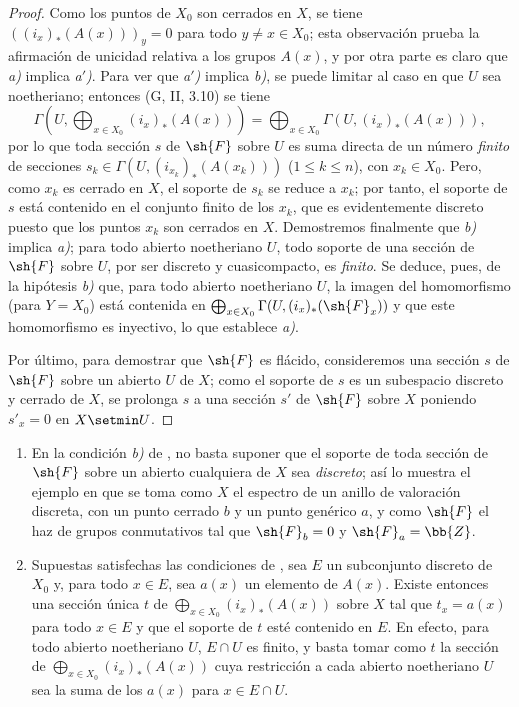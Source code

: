 \begin{proof}

Como los puntos de $X_0$ son cerrados en $X$, se tiene $((i_x)_*(A(x)))_y=0$ 
para todo $y\neq x\in X_0$;
esta observación prueba la afirmación de unicidad relativa a los grupos $A(x)$, y por otra parte es claro que \emph{a)} implica \emph{a$'$)}.
Para ver que \emph{a$'$)} implica \emph{b)}, se puede limitar al caso en que $U$ sea noetheriano;
entonces (G, II, 3.10) se tiene
\[
  \Gamma(U,\bigoplus_{x\in X_0}(i_x)_*(A(x)))
  =\bigoplus_{x\in X_0}\Gamma(U,(i_x)_*(A(x))),
\]
por lo que toda sección $s$ de $\sh{F}$ sobre $U$ es suma directa de un número \emph{finito} de secciones $s_k\in\Gamma(U,(i_{x_k})_*(A(x_k)))$ ($1\leq k\leq n$), con $x_k\in X_0$.
Pero, como $x_k$ es cerrado en $X$, el soporte de $s_k$ se reduce a $x_k$; por tanto, el soporte de $s$ está contenido en el conjunto finito de los $x_k$, que es evidentemente discreto puesto que los puntos $x_k$ son cerrados en $X$.
Demostremos finalmente que \emph{b)} implica \emph{a)};
para todo abierto noetheriano $U$, todo soporte de una sección de $\sh{F}$ sobre $U$, por ser discreto y cuasicompacto, es \emph{finito}.
Se deduce, pues, de la hipótesis \emph{b)} que, para todo abierto noetheriano $U$, la imagen del homomorfismo  (para $Y=X_0$) está contenida en $\bigoplus_{x\in X_0}\Gamma(U,(i_x)_*(\sh{F}_x))$ y que este homomorfismo es inyectivo, lo que establece \emph{a)}.

Por último, para demostrar que $\sh{F}$ es flácido, consideremos una sección $s$ de $\sh{F}$ sobre un abierto $U$ de $X$;
como el soporte de $s$ es un subespacio discreto y cerrado de $X$, se prolonga $s$ a una sección $s'$ de $\sh{F}$ sobre $X$ poniendo $s'_x=0$ en $X\setmin U$.
\end{proof}

\begin{remark}[21.9.3]
\label{IV.21.9.3}
\begin{enumerate}[label=(\roman*)]
  \item En la condición \emph{b)} de , no basta suponer que el soporte de toda sección de $\sh{F}$ sobre un abierto cualquiera de $X$ sea \emph{discreto};
así lo muestra el ejemplo en que se toma como $X$ el espectro de un anillo de valoración discreta, con un punto cerrado $b$ y un punto genérico $a$, y como $\sh{F}$ el haz de grupos conmutativos tal que $\sh{F}_b=0$ y $\sh{F}_a=\bb{Z}$.

  \item Supuestas satisfechas las condiciones de , sea $E$ un subconjunto discreto de $X_0$ y, para todo $x\in E$, sea $a(x)$ un elemento de $A(x)$.
Existe entonces una sección única $t$ de $\bigoplus_{x\in X_0}(i_x)_*(A(x))$ sobre $X$ tal que $t_x=a(x)$ para todo $x\in E$ y que el soporte de $t$ esté contenido en $E$.
En efecto, para todo abierto noetheriano $U$, $E\cap U$ es finito, y basta tomar como $t$ la sección de $\bigoplus_{x\in X_0}(i_x)_*(A(x))$ cuya restricción a cada abierto noetheriano $U$ sea la suma de los $a(x)$ para $x\in E\cap U$.
\end{enumerate}
\end{remark}

